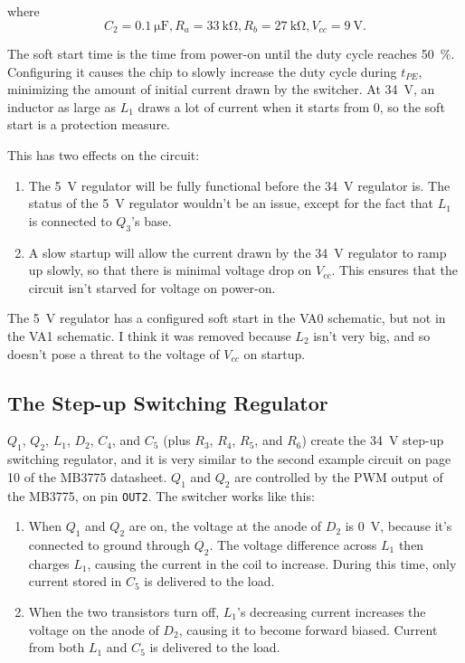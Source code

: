 \documentclass{article}
\newcommand{\Vcc}{$V_{cc}$}
\newcommand{\chippin}{\texttt}
\newcommand{\model}{\textsf}
\begin{document}
\noindent
where
\begin{displaymath}
  C_2 = \qty{0.1}{\micro\farad},R_a =
  \qty{33}{\kilo\ohm},R_b=\qty{27}{\kilo\ohm},V_{cc} = \qty{9}{\volt}.
\end{displaymath}

The soft start time is the time from power-on until the duty cycle
reaches \qty{50}{\%}. Configuring it causes the chip to slowly
increase the duty cycle during $t_{PE}$, minimizing the amount of
initial current drawn by the switcher. At \qty{34}{\volt}, an inductor
as large as $L_1$ draws a lot of current when it starts from 0, so the
soft start is a protection measure.

This has two effects on the circuit:

\begin{enumerate}
\item The \qty{5}{\volt} regulator will be fully functional before the
  \qty{34}{\volt} regulator is. The status of the \qty{5}{\volt}
  regulator wouldn't be an issue, except for the fact that $L_1$ is
  connected to $Q_3$'s base.
\item A slow startup will allow the current drawn by the
  \qty{34}{\volt} regulator to ramp up slowly, so that there is
  minimal voltage drop on \Vcc{}. This ensures that the circuit isn't
  starved for voltage on power-on.
\end{enumerate}

The \qty{5}{\volt} regulator has a configured soft start in the
\model{VA0} schematic, but not in the \model{VA1} schematic. I think
it was removed because $L_2$ isn't very big, and so doesn't pose a
threat to the voltage of \Vcc{} on startup.

\subsection{The Step-up Switching Regulator}
\label{sec:step-up_regulator}
$Q_1$, $Q_2$, $L_1$, $D_2$, $C_4$, and $C_5$ (plus $R_3$, $R_4$,
$R_5$, and $R_6$) create the \qty{34}{\volt} step-up switching
regulator, and it is very similar to the second example circuit on
page 10 of the \model{MB3775} datasheet. $Q_1$ and $Q_2$ are
controlled by the PWM output of the \model{MB3775}, on pin
\chippin{OUT2}. The switcher works like this:

\begin{enumerate}
\item When $Q_1$ and $Q_2$ are on, the voltage at the anode of $D_2$
  is \qty{0}{\volt}, because it's connected to ground through
  $Q_2$. The voltage difference across $L_1$ then charges $L_1$,
  causing the current in the coil to increase. During this time, only
  current stored in $C_5$ is delivered to the load.
\item When the two transistors turn off, $L_1$'s decreasing current
  increases the voltage on the anode of $D_2$, causing it to become
  forward biased. Current from both $L_1$ and $C_5$ is delivered to
  the load.
\end{enumerate}
\end{document}
